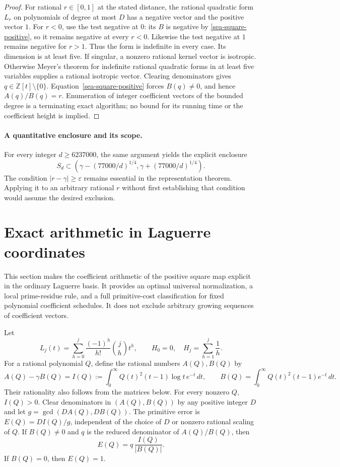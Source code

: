 \documentclass[11pt,a4paper]{article}
\theoremstyle{definition}
\theoremstyle{remark}
\begin{document}
\begin{proof}
For rational $r\in[0,1]$ at the stated distance, the rational quadratic
form $L_r$ on polynomials of degree at most $D$ has a negative vector and
the positive vector $1$.  For $r<0$, use the test negative at $0$:
its $B$ is negative by \eqref{sea-square-positive}, so it remains negative
at every $r<0$.  Likewise the test negative at $1$ remains negative for
$r>1$.  Thus the form is indefinite in every case.
Its dimension is at least five.  If singular, a nonzero rational kernel
vector is isotropic.  Otherwise Meyer's theorem for indefinite rational
quadratic forms in at least five variables supplies a rational isotropic
vector.  Clearing denominators gives $q\in\mathbb Z[t]\setminus\{0\}$.
Equation~\eqref{sea-square-positive} forces $B(q)\ne0$, and hence
$A(q)/B(q)=r$.  Enumeration of integer coefficient vectors of the bounded
degree is a terminating exact algorithm; no bound for its running time
or the coefficient height is implied.
\end{proof}

\paragraph{A quantitative enclosure and its scope.}
For every integer $d\ge6237000$, the same argument yields the explicit
enclosure
\[
 S_d\subset\left(\gamma-(77000/d)^{1/4},
                 \gamma+(77000/d)^{1/4}\right).
\]
The condition $|r-\gamma|\ge\varepsilon$ remains essential in the
representation theorem.  Applying it to an arbitrary rational $r$ without
first establishing that condition would assume the desired exclusion.


\section{Exact arithmetic in Laguerre coordinates}
\label{next-square-section}

This section makes the coefficient arithmetic of the positive square map
explicit in the ordinary Laguerre basis. It provides an optimal universal
normalization, a local prime-residue rule, and a full primitive-cost
classification for fixed polynomial coefficient schedules. It does not
exclude arbitrary growing sequences of coefficient vectors.

Let
\[
 L_j(t)=\sum_{h=0}^j\frac{(-1)^h}{h!}\binom jh t^h,\qquad
 H_0=0,\quad H_j=\sum_{h=1}^j\frac1h.
\]
For a rational polynomial $Q$, define the rational numbers $A(Q),B(Q)$ by
\[
 A(Q)-\gamma B(Q)
 =I(Q):=\int_0^\infty Q(t)^2(t-1)\log t\,e^{-t}\,dt,\qquad
 B(Q)=\int_0^\infty Q(t)^2(t-1)e^{-t}\,dt.
\]
Their rationality also follows from the matrices below. For every nonzero
$Q$, $I(Q)>0$. Clear denominators in $(A(Q),B(Q))$ by any positive integer
$D$ and let $g=\gcd(DA(Q),DB(Q))$. The primitive error is
$E(Q)=DI(Q)/g$, independent of the choice of $D$ or nonzero rational
scaling of $Q$. If $B(Q)\ne0$ and $q$ is the reduced denominator of
$A(Q)/B(Q)$, then
\begin{equation}
 E(Q)=q\,\frac{I(Q)}{|B(Q)|}.
 \label{next-square-primitive-error}
\end{equation}
If $B(Q)=0$, then $E(Q)=1$.
\end{document}
